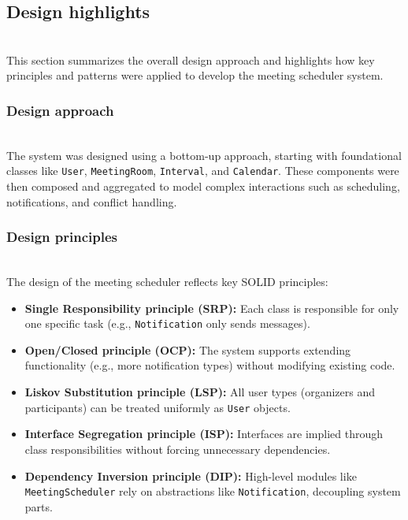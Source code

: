 \subsection{Design highlights}\label{NTm7DhN9WP_ZF4KiRASj1}
\\
This section summarizes the overall design approach and highlights how key principles and patterns were applied to develop the meeting scheduler system.

\subsubsection{Design approach}\label{nmjhY__HQlzSGFBzBJ_oJ}
\\
The system was designed using a bottom-up approach, starting with foundational classes like \texttt{User}, \texttt{MeetingRoom}, \texttt{Interval}, and \texttt{Calendar}. These components were then composed and aggregated to model complex interactions such as scheduling, notifications, and conflict handling.

\subsubsection{Design principles}\label{4hMyy7B7QRRagb14MwRDl}
\\
The design of the meeting scheduler reflects key SOLID principles:

\begin{itemize}
\item
\protect{}\label{W579bR1aZltjigsRR_V6n}
\textbf{Single Responsibility principle (SRP):} Each class is responsible for only one specific task (e.g., \texttt{Notification} only sends messages).
\item
\protect{}\label{vmLwVxOP11XIEg-ArukaJ}
\textbf{Open/Closed principle (OCP):} The system supports extending functionality (e.g., more notification types) without modifying existing code.
\item
\protect{}\label{-wvKqXzbIIxOWiFYnuWvV}
\textbf{Liskov Substitution principle (LSP):} All user types (organizers and participants) can be treated uniformly as \texttt{User} objects.
\item
\protect{}\label{qSossrMHfCvAmx599OQyH}
\textbf{Interface Segregation principle (ISP):} Interfaces are implied through class responsibilities without forcing unnecessary dependencies.
\item
\protect{}\label{yHHFfXtc5tMv3rYVsr52G}
\textbf{Dependency Inversion principle (DIP):} High-level modules like \texttt{MeetingScheduler} rely on abstractions like \texttt{Notification}, decoupling system parts.
\end{itemize}

